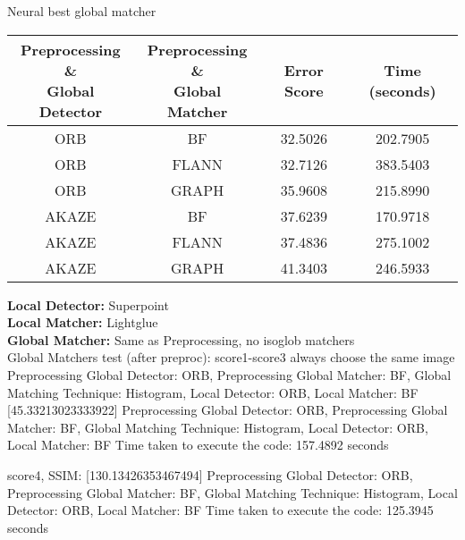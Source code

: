 Neural best global matcher

\begin{table}[H]
    \centering
    \begin{tabular}{|c|c|c|c|}
    \hline
    \makecell{\textbf{Preprocessing \&} \\ \textbf{Global Detector}} & \makecell{\textbf{Preprocessing \&} \\ \textbf{Global Matcher}} & \textbf{Error Score} & \textbf{Time (seconds)} \\ \hline
    ORB   & BF    & 32.5026 & 202.7905 \\ \hline
    ORB   & FLANN & 32.7126 & 383.5403 \\ \hline
    ORB   & GRAPH & 35.9608 & 215.8990 \\ \hline
    AKAZE & BF    & 37.6239 & 170.9718 \\ \hline
    AKAZE & FLANN & 37.4836 & 275.1002 \\ \hline
    AKAZE & GRAPH & 41.3403 & 246.5933 \\ \hline
    \end{tabular}
\end{table}

    
\textbf{Local Detector:} Superpoint \\
\textbf{Local Matcher:} Lightglue \\
\textbf{Global Matcher:} Same as Preprocessing, no isoglob matchers \\









Global Matchers test (after preproc):
score1-score3 always choose the same image 
Preprocessing Global Detector: ORB, Preprocessing Global Matcher: BF, Global Matching Technique: Histogram, Local Detector: ORB, Local Matcher: BF
[45.33213023333922]
Preprocessing Global Detector: ORB, Preprocessing Global Matcher: BF, Global Matching Technique: Histogram, Local Detector: ORB, Local Matcher: BF
Time taken to execute the code: 157.4892 seconds

score4, SSIM:
[130.13426353467494]
Preprocessing Global Detector: ORB, Preprocessing Global Matcher: BF, Global Matching Technique: Histogram, Local Detector: ORB, Local Matcher: BF
Time taken to execute the code: 125.3945 seconds










